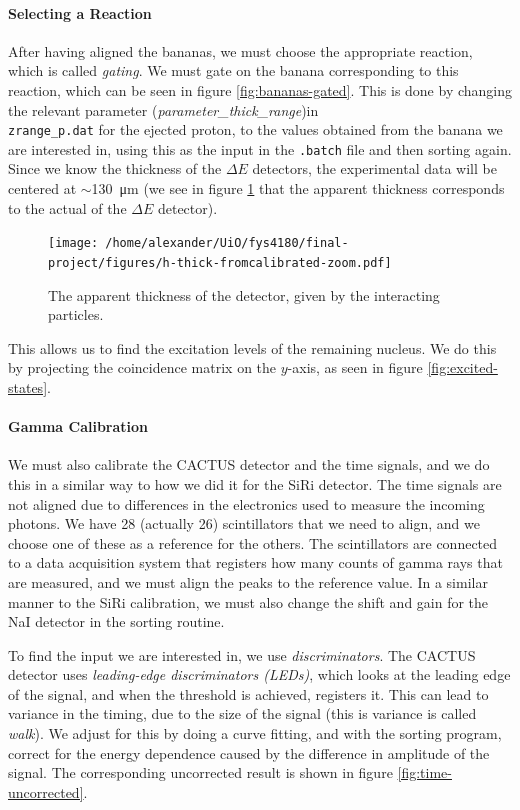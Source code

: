 \documentclass[a4paper,12pt]{article}
\begin{document}
\paragraph{Selecting a Reaction}
After having aligned the bananas, 
we must choose the appropriate reaction, which is
called \textit{gating}.
We must gate on the banana corresponding to
this reaction, which can be seen in figure \ref{fig:bananas-gated}.
This is done by changing the relevant parameter
(\textit{parameter_thick_range})in \\
\verb+zrange_p.dat+ for the ejected proton,
to the values obtained from the banana we are interested in,
using this as the input in the \verb+.batch+ file
and then sorting again.
Since we know the thickness of the $\Delta E$ detectors,
the experimental data will be centered at $\sim$\SI{130}{\micro\meter}
(we see in figure \ref{fig:de-thickness} that the apparent thickness
corresponds to the actual of the $\Delta E$ detector).

\begin{figure}[H]
    \centering
    \texttt{[image: /home/alexander/UiO/fys4180/final-project/figures/h-thick-fromcalibrated-zoom.pdf]}
    \caption{The apparent thickness of the detector, given by the interacting particles.}
    \caption{}
    \label{fig:de-thickness}
\end{figure}

This allows us to find the excitation levels of
the remaining nucleus. We do this by
projecting the coincidence matrix on the $y$-axis,
as seen in figure \ref{fig:excited-states}.

\paragraph{Gamma Calibration}
We must also calibrate the CACTUS detector and the time signals,
and we do this in a similar way to how we did it for the
SiRi detector.
The time signals are not aligned due to differences in
the electronics used to measure the incoming photons.
We have 28 (actually 26) scintillators that we need to align,
and we choose one of these as a reference for the others.
The scintillators are connected to a data acquisition system that
registers how many counts of gamma rays
that are measured, and we must align the peaks to the reference value.
In a similar manner to the SiRi calibration, we must
also change the shift and gain for the NaI detector in the sorting routine.

To find the input we are interested in, we use \textit{discriminators}.
The CACTUS detector uses \textit{leading-edge discriminators (LEDs)},
which looks at the leading edge of the signal,
and when the threshold is achieved, registers it.
This can lead to variance in the timing, due to the size
of the signal (this is variance is called \textit{walk}).
We adjust for this by doing a curve fitting, and
with the sorting program, correct for the energy dependence
caused by the difference in amplitude of the signal.
The corresponding uncorrected result
is shown in figure \ref{fig:time-uncorrected}.
\end{document}
